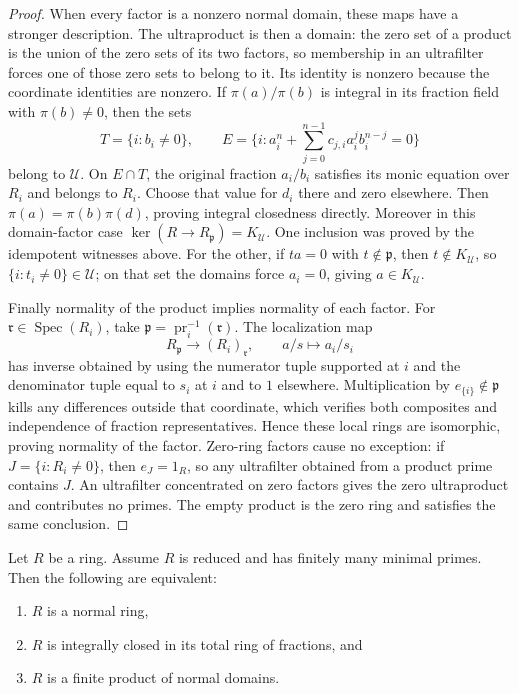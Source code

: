 \begin{proof}
When every factor is a nonzero normal domain, these maps have
a stronger description. The ultraproduct is then a domain:
the zero set of a product is the union of the zero sets of its
two factors, so membership in an ultrafilter forces one of those
zero sets to belong to it. Its identity is nonzero because the
coordinate identities are nonzero. If $\pi(a)/\pi(b)$ is integral
in its fraction field with $\pi(b)\ne0$, then the sets
$$
T=\{i:b_i\ne0\},\qquad
E=\{i:a_i^n+\sum_{j=0}^{n-1}c_{j,i}a_i^jb_i^{n-j}=0\}
$$
belong to $\mathcal U$. On $E\cap T$, the original fraction
$a_i/b_i$ satisfies its monic equation over $R_i$ and belongs
to $R_i$. Choose that value for $d_i$ there and zero elsewhere.
Then $\pi(a)=\pi(b)\pi(d)$, proving integral closedness directly.
Moreover in this domain-factor case
$\ker(R\to R_{\mathfrak p})=K_{\mathcal U}$.
One inclusion was proved by the idempotent witnesses above.
For the other, if $ta=0$ with $t\notin\mathfrak p$, then
$t\notin K_{\mathcal U}$, so $\{i:t_i\ne0\}\in\mathcal U$;
on that set the domains force $a_i=0$, giving $a\in K_{\mathcal U}$.

Finally normality of the product implies normality of each factor.
For $\mathfrak r\in\operatorname{Spec}(R_i)$, take
$\mathfrak p=\operatorname{pr}_i^{-1}(\mathfrak r)$.
The localization map
$$
R_{\mathfrak p}\longrightarrow(R_i)_{\mathfrak r},
\qquad a/s\longmapsto a_i/s_i
$$
has inverse obtained by using the numerator tuple supported at $i$
and the denominator tuple equal to $s_i$ at $i$ and to $1$ elsewhere.
Multiplication by $e_{\{i\}}\notin\mathfrak p$ kills any
differences outside that coordinate, which verifies both composites
and independence of fraction representatives. Hence these local
rings are isomorphic, proving normality of the factor.
Zero-ring factors cause no exception: if $J=\{i:R_i\ne0\}$,
then $e_J=1_R$, so any ultrafilter obtained from a product prime
contains $J$. An ultrafilter concentrated on zero factors gives
the zero ultraproduct and contributes no primes. The empty product
is the zero ring and satisfies the same conclusion.
\end{proof}

\begin{lemma}
\label{lemma-characterize-reduced-ring-normal}
Let $R$ be a ring. Assume $R$ is reduced and has finitely many
minimal primes. Then the following are equivalent:
\begin{enumerate}
\item $R$ is a normal ring,
\item $R$ is integrally closed in its total ring of fractions, and
\item $R$ is a finite product of normal domains.
\end{enumerate}
\end{lemma}

